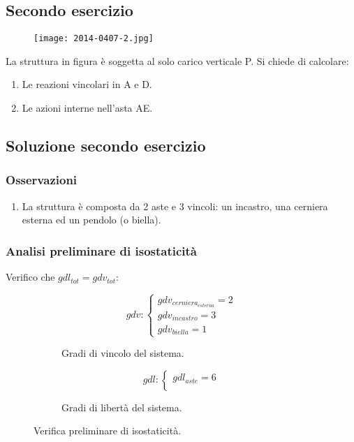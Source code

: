 \documentclass[main.tex]{subfiles}
\begin{document}
\subsection{Secondo esercizio}

\begin{figure}[H]
\centering
\texttt{[image: 2014-0407-2.jpg]}
\end{figure}

La struttura in figura è soggetta al solo carico verticale P. Si chiede di calcolare:

\begin{enumerate}
\item Le reazioni vincolari in A e D.
\item Le azioni interne nell’asta AE.
\end{enumerate}

\clearpage

\subsection{Soluzione secondo esercizio}

\subsubsection{Osservazioni}

\begin{enumerate}
\item La struttura è composta da 2 aste e 3 vincoli: un incastro, una cerniera esterna ed un pendolo (o biella).
\end{enumerate}

\subsubsection{Analisi preliminare di isostaticità}
Verifico che $gdl_{tot} = gdv_{tot}$:
\begin{figure}[H]
  \begin{subfigure}[b]{.5\textwidth}
  \centering
  \[
  	gdv: \begin{cases}
		gdv_{cerniera_{esterna}} = 2\\
		gdv_{incastro} = 3\\
		gdv_{biella} = 1
  	\end{cases}
  \]
  \caption{Gradi di vincolo del sistema.}
  \end{subfigure}
  \hfill
  \begin{subfigure}[b]{.5\textwidth}
  \centering
  \[
  	gdl: \begin{cases}
  		gdl_{aste} = 6\\
  	\end{cases}
  \]
  \caption{Gradi di libertà del sistema.}
  \end{subfigure}
  \caption{Verifica preliminare di isostaticità.}
\end{figure}
\end{document}
